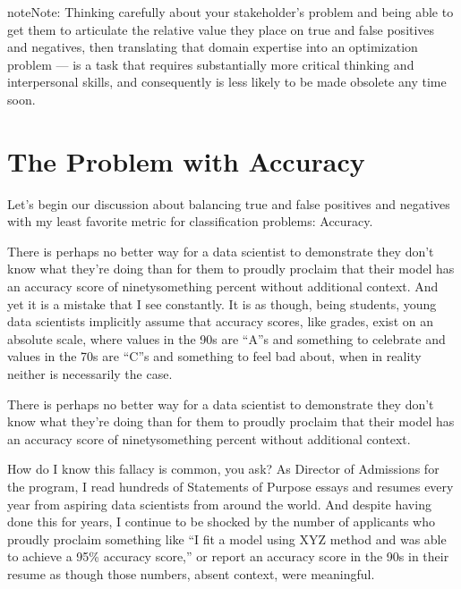 \documentclass[letterpaper,10pt,english]{jupyterBook}
\begin{document}
\begin{sphinxadmonition}{note}{Note:}
\sphinxAtStartPar
Thinking carefully about your stakeholder’s problem and being able to get them to articulate the relative value they place on true and false positives and negatives, then translating that domain expertise into an optimization problem —  is a task that requires substantially more critical thinking and interpersonal skills, and consequently is less likely to be made obsolete any time soon.
\end{sphinxadmonition}


\section{The Problem with Accuracy}
\label{\detokenize{30_questions/26_passive_prediction_errors:the-problem-with-accuracy}}
\sphinxAtStartPar
Let’s begin our discussion about balancing true and false positives and negatives with my least favorite metric for classification problems: Accuracy.

\sphinxAtStartPar
There is perhaps no better way for a data scientist to demonstrate they don’t know what they’re doing than for them to proudly proclaim that their model has an accuracy score of ninety\sphinxhyphen{}something percent without additional context. And yet it is a mistake that I see constantly. It is as though, being students, young data scientists implicitly assume that accuracy scores, like grades, exist on an absolute scale, where values in the 90s are “A”s and something to celebrate and values in the 70s are “C”s and something to feel bad about, when in reality neither is necessarily the case.

\begin{sphinxShadowBox}

\sphinxAtStartPar
There is perhaps no better way for a data scientist to demonstrate they don’t know what they’re doing than for them to proudly proclaim that their model has an accuracy score of ninety\sphinxhyphen{}something percent without additional context.
\end{sphinxShadowBox}

\sphinxAtStartPar
How do I know this fallacy is common, you ask? As Director of Admissions for the  program, I read hundreds of Statements of Purpose essays and resumes every year from aspiring data scientists from around the world. And despite having done this for years, I continue to be shocked by the number of applicants who proudly proclaim something like “I fit a model using XYZ method and was able to achieve a 95\% accuracy score,” or report an accuracy score in the 90s in their resume as though those numbers, absent context, were meaningful.
\end{document}
